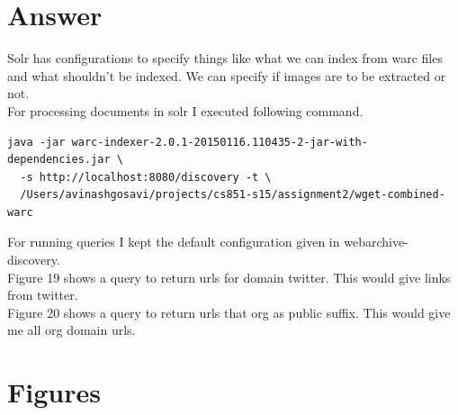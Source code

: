 \documentclass{article}
\begin{document}
\section{Answer}


Solr has configurations to specify things like what we can index from warc files and what shouldn’t be indexed. We can specify if images are to be extracted or not.\\

For processing documents in solr I executed following command.

\begin{verbatim}
java -jar warc-indexer-2.0.1-20150116.110435-2-jar-with-dependencies.jar \
  -s http://localhost:8080/discovery -t \
  /Users/avinashgosavi/projects/cs851-s15/assignment2/wget-combined-warc
\end{verbatim}

For running queries I kept the default configuration given in webarchive-discovery.\\

Figure 19 shows a query to return urls for domain twitter. This would give links from twitter.\\
Figure 20 shows a query to return urls that org as public suffix. This would give me all org domain urls.


\clearpage


\section{Figures}
\end{document}

